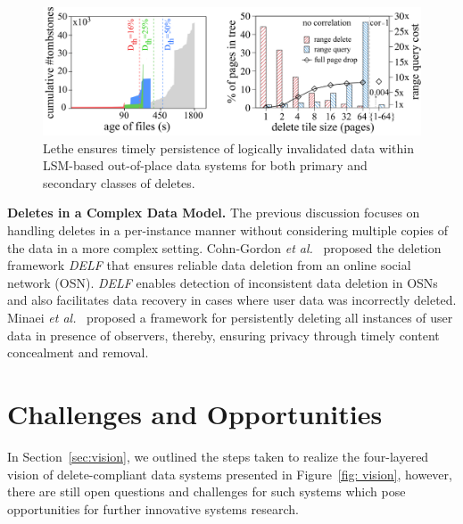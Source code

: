 \documentclass[11pt,dvipdfmx]{article}
\newcommand\Paragraph[1]{\vspace{0.02in}  \noindent \textbf{#1.}}
\begin{document}
\begin{figure}[t]
    \centering  
        \includegraphics[width=\textwidth]{figs/lethe_figures.pdf} 
   \vspace{-0.25in}        
    \caption{Lethe ensures timely persistence of logically invalidated data within LSM-based out-of-place data systems for both primary and secondary classes of deletes.}
    \label{fig:results} 
   \vspace{-0.15in}        
\end{figure} 

\newpage
\Paragraph{Deletes in a Complex Data Model} The previous discussion focuses on
handling deletes in a per-instance manner without considering multiple copies of the
data in a more complex setting. Cohn-Gordon \textit{et al.}~\cite{Cohn-Gordon2020} proposed the deletion 
framework \textit{DELF} that ensures reliable data deletion from an online social 
network (OSN). 
\textit{DELF} enables detection of inconsistent data deletion in OSNs and also 
facilitates data recovery in cases where user data was incorrectly deleted. 
Minaei \textit{et al.}~\cite{Minaei2019} proposed a framework for persistently deleting all instances 
of user data in presence of observers, thereby, ensuring privacy through timely 
content concealment and removal. 





 
\section{Challenges and Opportunities}
\label{sec:challenges}
\vspace{-0.075in}



In Section~\ref{sec:vision}, we outlined the steps taken to realize the four-layered
vision of delete-compliant data systems presented in Figure~\ref{fig: vision}, 
however, there are still open questions and challenges for such systems which pose
opportunities for further innovative systems research.
\end{document}
